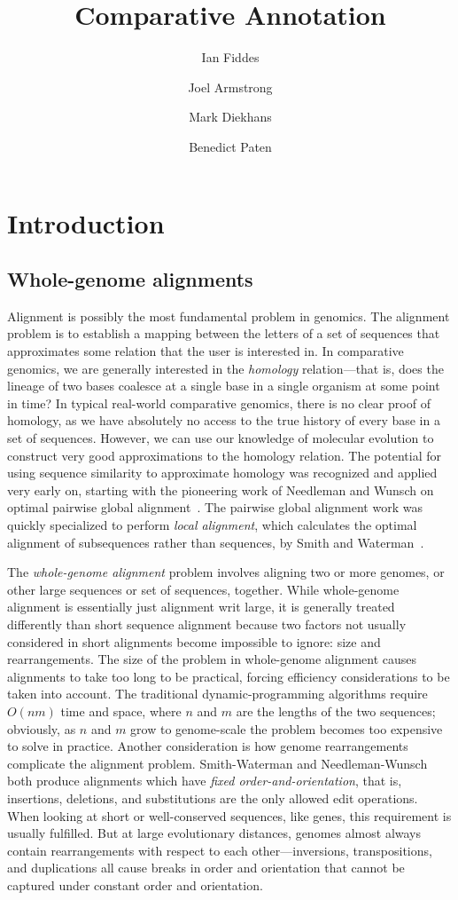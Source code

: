 \documentclass[fleqn,10pt]{wlscirep}
\title{Comparative Annotation}
\author[1,+]{Ian Fiddes}
\author[1,+]{Joel Armstrong}
\author[1,]{Mark Diekhans}
\author[1,*]{Benedict Paten}
\affil[1]{UCSC}
\affil[*]{corresponding.author@email.example}
\affil[+]{these authors contributed equally to this work}
\begin{document}
\flushbottom
\maketitle

\thispagestyle{empty}

\section*{Introduction}
\subsection*{Whole-genome alignments}
Alignment is possibly the most fundamental problem in genomics.
The alignment problem is to establish a mapping between the letters of a set of sequences that approximates some relation that the user is interested in.
In comparative genomics, we are generally interested in the \emph{homology} relation---that is, does the lineage of two bases coalesce at a single base in a single organism at some point in time?
In typical real-world comparative genomics, there is no clear proof of homology, as we have absolutely no access to the true history of every base in a set of sequences.
However, we can use our knowledge of molecular evolution to construct very good approximations to the homology relation.
The potential for using sequence similarity to approximate homology was recognized and applied very early on, starting with the pioneering work of Needleman and Wunsch on optimal pairwise global alignment~\cite{Needleman1970443}.
The pairwise global alignment work was quickly specialized to perform \emph{local alignment}, which calculates the optimal alignment of subsequences rather than sequences, by Smith and Waterman~\cite{Smith1981}.

The \emph{whole-genome alignment} problem involves aligning two or more genomes, or other large sequences or set of sequences, together.
While whole-genome alignment is essentially just alignment writ large, it is generally treated differently than short sequence alignment because two factors not usually considered in short alignments become impossible to ignore: size and rearrangements.
The size of the problem in whole-genome alignment causes alignments to take too long to be practical, forcing efficiency considerations to be taken into account.
The traditional dynamic-programming algorithms require $O(nm)$ time and space, where $n$ and $m$ are the lengths of the two sequences; obviously, as $n$ and $m$ grow to genome-scale the problem becomes too expensive to solve in practice.
Another consideration is how genome rearrangements complicate the alignment problem.
Smith-Waterman and Needleman-Wunsch both produce alignments which have \emph{fixed order-and-orientation}, that is, insertions, deletions, and substitutions are the only allowed edit operations.
When looking at short or well-conserved sequences, like genes, this requirement is usually fulfilled.
But at large evolutionary distances, genomes almost always contain rearrangements with respect to each other---inversions, transpositions, and duplications all cause breaks in order and orientation that cannot be captured under constant order and orientation.
\end{document}
